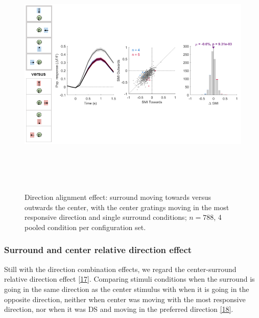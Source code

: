 \begin{figure}[H] \centering \includegraphics[width=12cm,height=12cm,keepaspectratio]{Figures/7.Results/finalPopulation/sel/diagrams/16.png} 
\caption{Direction alignment effect: surround moving towards versus outwards the center, with the center gratings moving in the most responsive direction and single surround conditions;  $n=788$, 4 pooled condition per configuration set.} \label{16}
\end{figure}
 

\subsubsection{Surround and center relative direction effect}

Still with the direction combination effects, we regard the center-surround relative direction effect \ref{17}. Comparing stimuli conditions when the surround is going in the same direction as the center stimulus with when it is going in the opposite direction, neither when center was moving with the most responsive direction, nor when it was DS and moving in the preferred direction \ref{18}.


